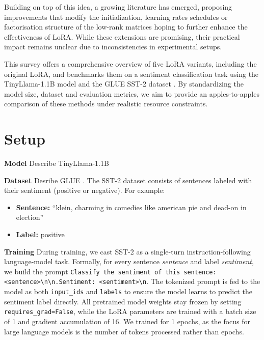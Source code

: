 \documentclass[a4paper,10pt,twocolumn,english]{article}
\begin{document}
Building on top of this idea, a growing literature has emerged, proposing improvements that modify the initialization, learning rates schedules or factorisation structure of the low-rank matrices hoping to further enhance the effectiveness of LoRA. While these extensions are promising, their practical impact remains unclear due to inconsistencies in experimental setups.

This survey offers a comprehensive overview of five LoRA variants, including the original LoRA, and benchmarks them on a sentiment classification task using the TinyLlama-1.1B model \cite{zhang2024tinyllamaopensourcesmalllanguage} and the GLUE SST-2 dataset \cite{wang2019gluemultitaskbenchmarkanalysis}. By standardizing the model size, dataset and evaluation metrics, we aim to provide an apples-to-apples comparison of these methods under realistic resource constraints.

\section{Setup}
\noindent\textbf{Model} Describe TinyLlama-1.1B \cite{zhang2024tinyllamaopensourcesmalllanguage} 

\noindent\textbf{Dataset} Desribe GLUE \cite{wang2019gluemultitaskbenchmarkanalysis}. The SST-2 dataset consists of sentences labeled with their sentiment (positive or negative). For example:

\begin{itemize}
    \item \textbf{Sentence:} ``klein, charming in comedies like american pie and dead-on in election''
    \item \textbf{Label:} positive
\end{itemize}

\noindent\textbf{Training} During training, we cast SST-2 as a single-turn instruction-following language-model task. Formally, for every sentence \textit{sentence} and label \textit{sentiment}, we build the prompt \texttt{Classify the sentiment of this sentence: <sentence>\textbackslash n\textbackslash n.Sentiment: <sentiment>\textbackslash n}. The tokenized prompt is fed to the model as both \texttt{input\_ids} and \texttt{labels} to ensure the model learns to predict the sentiment label directly. All pretrained model weights stay frozen by setting \texttt{requires\_grad=False}, while the LoRA parameters are trained with a batch size of 1 and gradient accumulation of 16. We trained for 1 epochs, as the focus for large language models is the number of tokens processed rather than epochs. 
\end{document}
